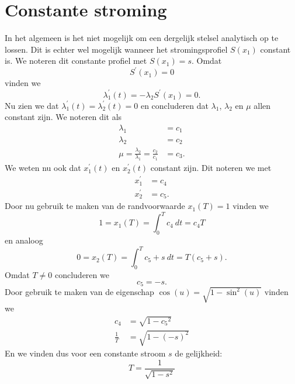 \section{Constante stroming}
In het algemeen is het niet mogelijk om een dergelijk stelsel analytisch op te lossen. Dit is echter wel mogelijk wanneer het stromingsprofiel \(S(x_1)\) constant is. We noteren dit constante profiel met \(S(x_1)=s\). Omdat
\begin{equation*}
	S^\prime(x_1) = 0
\end{equation*}
vinden we
\begin{equation*}
	\lambda_1^\prime(t) =  -\lambda_2S^\prime(x_1) = 0.
\end{equation*}
Nu zien we dat \(\lambda_1^\prime(t) = \lambda_2^\prime(t)=0\) en concluderen dat \(\lambda_1\), \(\lambda_2\) en \(\mu\) allen constant zijn. We noteren dit als
\begin{align*}
	\lambda_1 &= c_1 \\
	\lambda_2 &= c_2 \\
	\mu = \frac{\lambda_2 }{\lambda_1} = \frac{c_2 }{c_1} &= c_3.
\end{align*}
We weten nu ook dat \(x_1^\prime(t)\) en \(x_2^\prime(t)\) constant zijn. Dit noteren we met
\begin{align*}
	x_1^\prime &= c_4 \\
	x_2^\prime &= c_5.
\end{align*}
Door nu gebruik te maken van de randvoorwaarde \(x_1(T)=1\) vinden we
\begin{equation}
	1 = x_1(T) = \int_0^T c_4 ~dt = c_4 T 
\end{equation}
en analoog
\begin{equation}
	0= x_2(T) = \int_0^T c_5 + s~ dt = T(c_5 + s).
\end{equation}
Omdat \(T \neq 0\) concluderen we
\begin{equation*}
	c_5=-s.
\end{equation*}
Door gebruik te maken van de eigenschap \(\cos(u) = \sqrt{1-\sin^2(u)}\) vinden we
\begin{align*}
	c_4 &= \sqrt{1-{c_5}^2}\\
	\frac{1}{T} &= \sqrt{1-(-s)^2}
\end{align*}
En we vinden dus voor een constante stroom \(s\) de gelijkheid:
\begin{equation}
	T=\frac{1}{\sqrt{1-s^2}}\label{eq:Tconst}
\end{equation}
